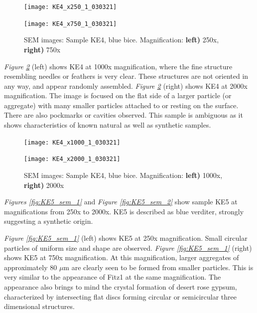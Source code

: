 \begin{figure}[H]
\centering
\begin{minipage}{.45\textwidth}
  \centering
  \texttt{[image: KE4\_x250\_1\_030321]}
\end{minipage}
\begin{minipage}{.45\textwidth}
  \centering
  \texttt{[image: KE4\_x750\_1\_030321]}
\end{minipage}
\caption[SEM images: Sample KE4, blue bice]{SEM images: Sample KE4, blue bice. Magnification: \textbf{left)} 250x, \textbf{right)} 750x}
\label{fig:KE4_sem_1}
\end{figure}

\textit{Figure \ref{fig:KE4_sem_2}} (left) shows KE4 at 1000x magnification, where the fine structure resembling needles or feathers is very clear. These structures are not oriented in any way, and appear randomly assembled. \textit{Figure \ref{fig:KE4_sem_2}} (right) shows KE4 at 2000x magnification. The image is focused on the flat side of a larger particle (or aggregate) with many smaller particles attached to or resting on the surface. There are also pockmarks or cavities observed. This sample is ambiguous as it shows characteristics of known natural as well as synthetic samples.

\begin{figure}[H]
\centering
\begin{minipage}{.45\textwidth}
  \centering
  \texttt{[image: KE4\_x1000\_1\_030321]}
\end{minipage}
\begin{minipage}{.45\textwidth}
  \centering
  \texttt{[image: KE4\_x2000\_1\_030321]}
\end{minipage}
\caption[SEM images: Sample KE4, blue bice]{SEM images: Sample KE4, blue bice. Magnification: \textbf{left)} 1000x, \textbf{right)} 2000x}
\label{fig:KE4_sem_2}
\end{figure}


\textit{Figures \ref{fig:KE5_sem_1}} and \textit{Figure \ref{fig:KE5_sem_2}} show sample KE5 at magnifications from 250x to 2000x. KE5 is described as blue verditer, strongly suggesting a synthetic origin.

\textit{Figure \ref{fig:KE5_sem_1}} (left) shows KE5 at 250x magnification. Small circular particles of uniform size and shape are observed. \textit{Figure \ref{fig:KE5_sem_1}} (right) shows KE5 at 750x magnification. At this magnification, larger aggregates of approximately 80 $\mu$m are clearly seen to be formed from smaller particles. This is very similar to the appearance of Fitz1 at the same magnification. The appearance also brings to mind the crystal formation of desert rose gypsum, characterized by intersecting flat discs forming circular or semicircular three dimensional structures.%


